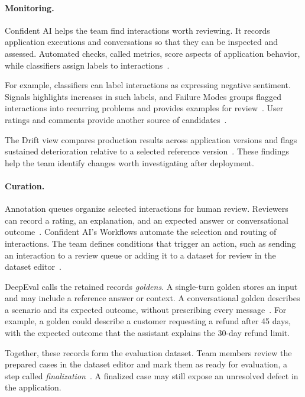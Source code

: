 \paragraph{Monitoring.}
Confident AI helps the team find interactions worth reviewing. It records
application executions and conversations so that they can be inspected and
assessed. Automated checks, called metrics, score aspects of application
behavior, while classifiers assign labels to
interactions~\parencite{DeepEval:MultiTurn,ConfidentAI:OnlineEvals,
ConfidentAI:Classifiers}.

For example, classifiers can label interactions as expressing negative
sentiment. Signals highlights increases in such labels, and Failure Modes
groups flagged interactions into recurring problems and provides examples
for review~\parencite{ConfidentAI:Classifiers,ConfidentAI:Signals,
ConfidentAI:FailureModes}. User ratings and comments provide another source of
candidates~\parencite{ConfidentAI:AnnotationQueues}.

The Drift view compares production results across application versions and
flags sustained deterioration relative to a selected reference
version~\parencite{ConfidentAI:Drift}. These findings help the team identify
changes worth investigating after deployment.

\paragraph{Curation.}
Annotation queues organize selected interactions for human review. Reviewers
can record a rating, an explanation, and an expected answer or conversational
outcome~\parencite{ConfidentAI:AnnotationQueues}. Confident AI's Workflows
automate the selection and routing of interactions. The team defines conditions
that trigger an action, such as sending an interaction to a review queue or
adding it to a dataset for review in the dataset
editor~\parencite{ConfidentAI:Workflows,ConfidentAI:Datasets}.

DeepEval calls the retained records \emph{goldens}. A single-turn golden stores
an input and may include a reference answer or context. A conversational golden
describes a scenario and its expected outcome, without prescribing every
message~\parencite{ConfidentAI:Datasets,DeepEval:MultiTurn}. For example, a
golden could describe a customer requesting a refund after 45 days, with the
expected outcome that the assistant explains the 30-day refund limit.

Together, these records form the evaluation dataset. Team members review the
prepared cases in the dataset editor and mark them as ready for evaluation,
a step called \emph{finalization}~\parencite{ConfidentAI:Datasets}. A finalized
case may still expose an unresolved defect in the application.

